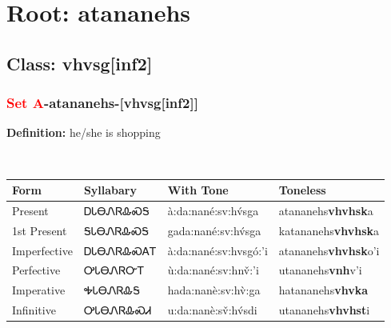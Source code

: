 \needspace{4in}
\section*{Root: atananehs}
\nopagebreak
{}
\needspace{3in}
\subsection*{Class: vhvsg[inf2]}
\nopagebreak
\needspace{2in}
\subsubsection*{\textcolor{Red}{Set A}{-}\textbf{atananehs}{-}[vhvsg[inf2]]}
\nopagebreak
\textbf{Definition: } he/she is shopping
\\[0.5em]
\begin{tabularx}{\textwidth}{l X X X}%
\toprule%
\textbf{Form}&\textbf{Syllabary}&\textbf{With Tone}&\textbf{Toneless}\\%
\midrule%
Present&ᎠᏓᎾᏁᏒᎲᏍᎦ&à:da:nané:sv:hv́sga&atananehs\textbf{vhvhsk}a\\%
1st Present&ᎦᏓᎾᏁᏒᎲᏍᎦ&gada:nané:sv:hv́sga&katananehs\textbf{vhvhsk}a\\%
Imperfective&ᎠᏓᎾᏁᏒᎲᏍᎪᎢ&à:da:nané:sv:hvsgó:’i&atananehs\textbf{vhvhsk}o'i\\%
Perfective&ᎤᏓᎾᏁᏒᏅᎢ&ù:da:nané:sv:hnv̌:’i&utananehs\textbf{vnh}v'i\\%
Imperative&ᎭᏓᎾᏁᏒᎲᎦ&hada:nanè:sv:hv̀:ga&hatananehs\textbf{vhvka}\\%
Infinitive&ᎤᏓᎾᏁᏒᎲᏍᏗ&u:da:nanè:sv̌:hv́sdi&utananehs\textbf{vhvhst}i\\%
\bottomrule%
\end{tabularx}
\\[1em]